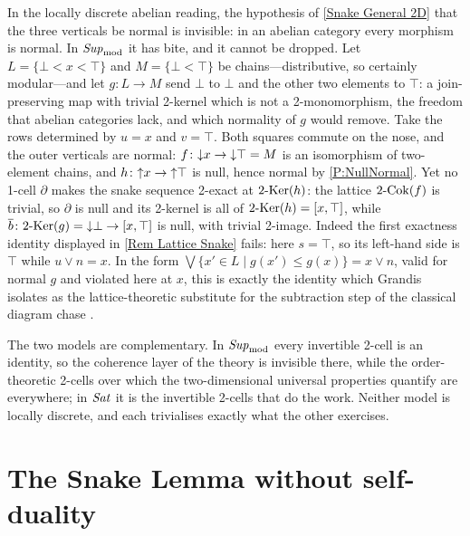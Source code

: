 \begin{remark}
  \label{Rem Lattice Sharp}
  In the locally discrete abelian reading, the hypothesis of \thex\ref{Snake General 2D} that the three verticals be normal is invisible: in an abelian category every morphism is normal. In \(\mathit{Sup}_{\mathrm{mod}}\) it has bite, and it cannot be dropped. Let \(L=\{\bot<x<\top\}\) and \(M=\{\bot<\top\}\) be chains---distributive, so certainly modular---and let \(g\colon L\to M\) send \(\bot\) to \(\bot\) and the other two elements to \(\top\): a join-preserving map with trivial 2-kernel which is not a 2-monomorphism, the freedom that abelian categories lack, and which normality of \(g\) would remove. Take the rows determined by \(u=x\) and \(v=\top\). Both squares commute on the nose, and the outer verticals are normal: \(f\colon{\downarrow}x\to{\downarrow}\top=M\) is an isomorphism of two-element chains, and \(h\colon{\uparrow}x\to{\uparrow}\top\) is null, hence normal by \prox\ref{P:NullNormal}. Yet no 1-cell \(\partial\) makes the snake sequence 2-exact at \(2\text{-}\mathrm{Ker}(h)\): the lattice \(2\text{-}\mathrm{Cok}(f)\) is trivial, so \(\partial\) is null and its 2-kernel is all of \(2\text{-}\mathrm{Ker}(h)=[x,\top]\), while \(\overline{b}\colon2\text{-}\mathrm{Ker}(g)={\downarrow}\bot\to[x,\top]\) is null, with trivial 2-image. Indeed the first exactness identity displayed in \remx\ref{Rem Lattice Snake} fails: here \(s=\top\), so its left-hand side is \(\top\) while \(u\vee n=x\). In the form \(\bigvee\{x'\in L\mid g(x')\leq g(x)\}=x\vee n\), valid for normal \(g\) and violated here at \(x\), this is exactly the identity which Grandis isolates as the lattice-theoretic substitute for the subtraction step of the classical diagram chase \cite[2.3.5]{Grandis-HA2}.
\end{remark}

\begin{remark}
  \label{Rem Lattice Scope}
  The two models are complementary. In \(\mathit{Sup}_{\mathrm{mod}}\) every invertible 2-cell is an identity, so the coherence layer of the theory is invisible there, while the order-theoretic 2-cells over which the two-dimensional universal properties quantify are everywhere; in \(\mathit{Sat}\) it is the invertible 2-cells that do the work. Neither model is locally discrete, and each trivialises exactly what the other exercises.
\end{remark}

\section{The Snake Lemma without self-duality}\label{S:NonSelfDual}

